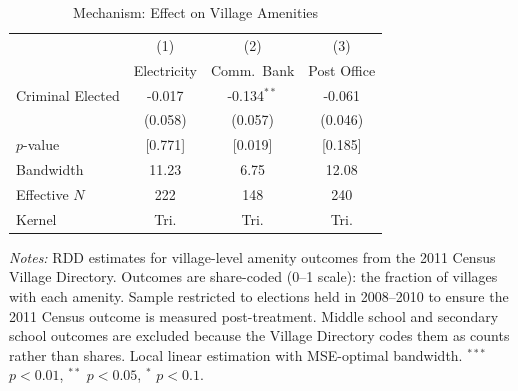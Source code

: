 \begin{table}[htbp]
\centering
\caption{Mechanism: Effect on Village Amenities}
\label{tab:mechanism}
\begin{tabular}{l ccc}
\toprule
  & (1) & (2) & (3) \\
  & Electricity & Comm.\ Bank & Post Office \\
\midrule
Criminal Elected & -0.017 & -0.134$^{**}$ & -0.061 \\
  & (0.058) & (0.057) & (0.046) \\
$p$-value & [0.771] & [0.019] & [0.185] \\
\addlinespace[4pt]
Bandwidth & 11.23 & 6.75 & 12.08 \\
Effective $N$ & 222 & 148 & 240 \\
Kernel & Tri. & Tri. & Tri. \\
\bottomrule
\end{tabular}
\begin{minipage}{0.92\textwidth}
\vspace{4pt}
\footnotesize
\textit{Notes:} RDD estimates for village-level amenity outcomes from the 2011 Census
Village Directory. Outcomes are share-coded (0--1 scale): the fraction of villages
with each amenity. Sample restricted to elections held in 2008--2010 to ensure
the 2011 Census outcome is measured post-treatment. Middle school and secondary
school outcomes are excluded because the Village Directory codes them as counts
rather than shares. Local linear estimation with MSE-optimal bandwidth.
$^{***}$ $p<0.01$, $^{**}$ $p<0.05$, $^{*}$ $p<0.1$.
\end{minipage}
\end{table}
